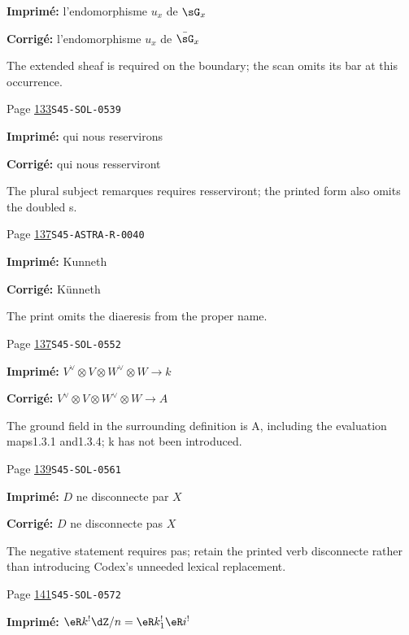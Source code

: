 \begin{description}
\par\noindent\textbf{Imprimé:} l'endomorphisme $u_x$ de $\sG_x$
\par\noindent\textbf{Corrigé:} l'endomorphisme $u_x$ de $\bar\sG_x$
\par\noindent The extended sheaf is required on the boundary; the scan omits its bar at this occurrence.
\smallskip
\item[\hypertarget{apparatus:FR-0092}{92}] Page \hyperlink{printpage:fr:133}{133}\quad\texttt{S45-SOL-0539}
\par\noindent\textbf{Imprimé:} qui nous reservirons
\par\noindent\textbf{Corrigé:} qui nous resserviront
\par\noindent The plural subject remarques requires resserviront; the printed form also omits the doubled s.
\smallskip
\item[\hypertarget{apparatus:FR-0093}{93}] Page \hyperlink{printpage:fr:137}{137}\quad\texttt{S45-ASTRA-R-0040}
\par\noindent\textbf{Imprimé:} Kunneth
\par\noindent\textbf{Corrigé:} K\"unneth
\par\noindent The print omits the diaeresis from the proper name.
\smallskip
\item[\hypertarget{apparatus:FR-0094}{94}] Page \hyperlink{printpage:fr:137}{137}\quad\texttt{S45-SOL-0552}
\par\noindent\textbf{Imprimé:} \(V^\vee\otimes V\otimes W^\vee\otimes W\to k\)
\par\noindent\textbf{Corrigé:} \(V^\vee\otimes V\otimes W^\vee\otimes W\to A\)
\par\noindent The ground field in the surrounding definition is A, including the evaluation maps1.3.1 and1.3.4; k has not been introduced.
\smallskip
\item[\hypertarget{apparatus:FR-0095}{95}] Page \hyperlink{printpage:fr:139}{139}\quad\texttt{S45-SOL-0561}
\par\noindent\textbf{Imprimé:} $D$ ne disconnecte par $X$
\par\noindent\textbf{Corrigé:} $D$ ne disconnecte pas $X$
\par\noindent The negative statement requires pas; retain the printed verb disconnecte rather than introducing Codex’s unneeded lexical replacement.
\smallskip
\item[\hypertarget{apparatus:FR-0096}{96}] Page \hyperlink{printpage:fr:141}{141}\quad\texttt{S45-SOL-0572}
\par\noindent\textbf{Imprimé:} \(\eR k^! \dZ/n=\eR k_1^! \eR i^!\)

\end{description}
